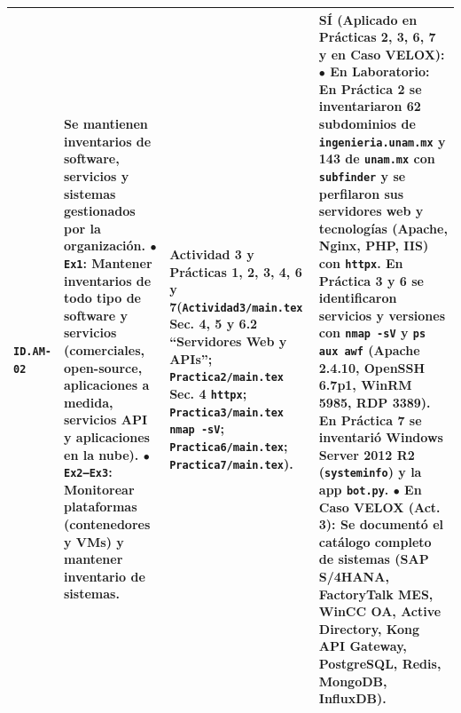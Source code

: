 \documentclass[letterpaper,11pt]{article}
\begin{document}
\begin{longtable}{|C{1.5cm}|L{5.3cm}|L{4.3cm}|L{5.8cm}|}
\texttt{ID.AM-02} &
\textbf{Se mantienen inventarios de software, servicios y sistemas gestionados por la organización.}\newline
$\bullet$ \texttt{Ex1}: Mantener inventarios de todo tipo de software y servicios (comerciales, open-source, aplicaciones a medida, servicios API y aplicaciones en la nube).\newline
$\bullet$ \texttt{Ex2--Ex3}: Monitorear plataformas (contenedores y VMs) y mantener inventario de sistemas. &
\textbf{Actividad 3 y Prácticas 1, 2, 3, 4, 6 y 7}\newline (\texttt{Actividad3/main.tex} Sec. 4, 5 y 6.2 ``Servidores Web y APIs''; \texttt{Practica2/main.tex} Sec. 4 \texttt{httpx}; \texttt{Practica3/main.tex} \texttt{nmap -sV}; \texttt{Practica6/main.tex}; \texttt{Practica7/main.tex}). &
\textbf{SÍ (Aplicado en Prácticas 2, 3, 6, 7 y en Caso VELOX):}\newline
$\bullet$ \textbf{En Laboratorio:} En \textbf{Práctica 2} se inventariaron 62 subdominios de \texttt{ingenieria.unam.mx} y 143 de \texttt{unam.mx} con \texttt{subfinder} y se perfilaron sus servidores web y tecnologías (Apache, Nginx, PHP, IIS) con \texttt{httpx}. En \textbf{Práctica 3 y 6} se identificaron servicios y versiones con \texttt{nmap -sV} y \texttt{ps aux awf} (Apache 2.4.10, OpenSSH 6.7p1, WinRM 5985, RDP 3389). En \textbf{Práctica 7} se inventarió Windows Server 2012 R2 (\texttt{systeminfo}) y la app \texttt{bot.py}.\newline
$\bullet$ \textbf{En Caso VELOX (Act. 3):} Se documentó el catálogo completo de sistemas (SAP S/4HANA, FactoryTalk MES, WinCC OA, Active Directory, Kong API Gateway, PostgreSQL, Redis, MongoDB, InfluxDB). \\
\hline


\end{longtable}
\end{document}
